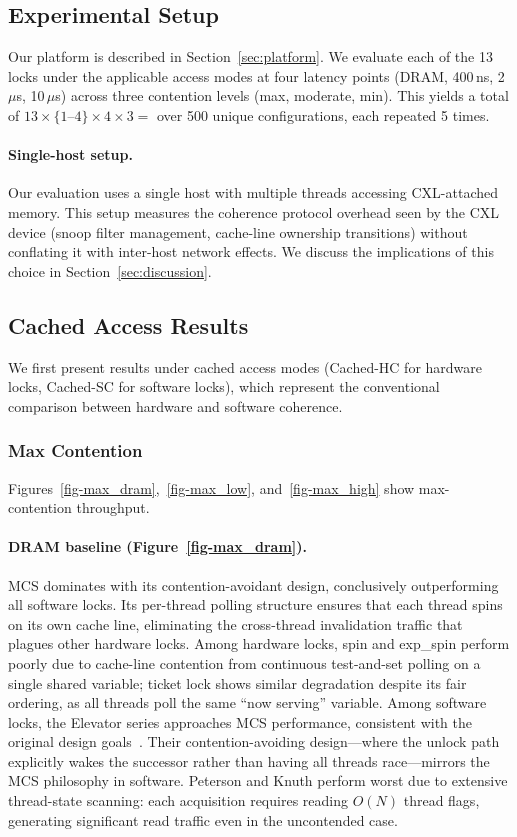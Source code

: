 \subsection{Experimental Setup}

Our platform is described in Section~\ref{sec:platform}.
We evaluate each of the 13 locks under the applicable access modes at four latency points (DRAM, 400\,ns, 2\,$\mu$s, 10\,$\mu$s) across three contention levels (max, moderate, min).
This yields a total of $13 \times \{1\text{--}4\} \times 4 \times 3 = $ over 500 unique configurations, each repeated 5 times.

\paragraph{Single-host setup.}
Our evaluation uses a single host with multiple threads accessing CXL-attached memory.
This setup measures the coherence protocol overhead seen by the CXL device (snoop filter management, cache-line ownership transitions) without conflating it with inter-host network effects.
We discuss the implications of this choice in Section~\ref{sec:discussion}.

\subsection{Cached Access Results}

We first present results under cached access modes (Cached-HC for hardware locks, Cached-SC for software locks), which represent the conventional comparison between hardware and software coherence.

\subsubsection{Max Contention}

Figures~\ref{fig-max_dram},~\ref{fig-max_low}, and~\ref{fig-max_high} show max-contention throughput.

\paragraph{DRAM baseline (Figure~\ref{fig-max_dram}).}
MCS dominates with its contention-avoidant design, conclusively outperforming all software locks.
Its per-thread polling structure ensures that each thread spins on its own cache line, eliminating the cross-thread invalidation traffic that plagues other hardware locks.
Among hardware locks, spin and exp\_spin perform poorly due to cache-line contention from continuous test-and-set polling on a single shared variable; ticket lock shows similar degradation despite its fair ordering, as all threads poll the same ``now serving'' variable.
Among software locks, the Elevator series approaches MCS performance, consistent with the original design goals~\cite{buhrHighcontentionMutualExclusion2018}.
Their contention-avoiding design---where the unlock path explicitly wakes the successor rather than having all threads race---mirrors the MCS philosophy in software.
Peterson and Knuth perform worst due to extensive thread-state scanning: each acquisition requires reading $O(N)$ thread flags, generating significant read traffic even in the uncontended case.


